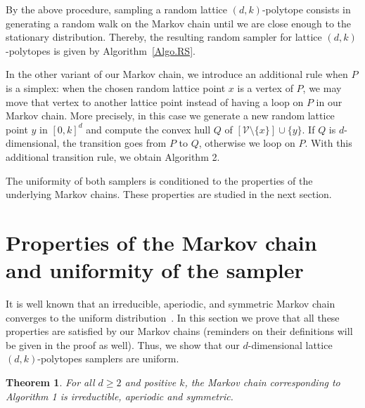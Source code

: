 \documentclass[a4paper]{article}
\newtheorem{theorem}{Theorem}
\begin{document}
By the above procedure, sampling a random lattice $(d,k)$-polytope consists in generating a random walk on the Markov chain until we are close enough to the stationary distribution. Thereby, the resulting random sampler for lattice $(d,k)$-polytopes is given by Algorithm~\ref{Algo.RS}.



In the other variant of our Markov chain, we introduce an additional rule when $P$ is a simplex: when the chosen random lattice point $x$ is a vertex of $P$, we may move that vertex to another lattice point instead of having a loop on $P$ in our Markov chain. More precisely, in this case we generate a new random lattice point $y$ in $[0,k]^d$ and compute the convex hull $Q$ of $[\mathcal{V}\mathord{\setminus}\{x\}]\cup\{y\}$. If $Q$ is $d$-dimensional, the transition goes from $P$ to $Q$, otherwise we loop on $P$. With this additional transition rule, we obtain Algorithm 2.\\



\vskip 12pt

The uniformity of both samplers is conditioned to the properties of the underlying Markov chains. These properties are studied in the next section.

\section{Properties of the Markov chain and uniformity of the sampler}\label{Sec.Pr}

It is well known that an irreducible, aperiodic, and symmetric Markov chain converges to the uniform distribution~\cite{levin2009markov}. In this section we prove that all these properties are satisfied by our Markov chains (reminders on their definitions will be given in the proof as well). Thus, we show that our $d$-dimensional lattice $(d,k)$-polytopes samplers are uniform.

\begin{theorem}\label{Thm.MC}
  For all $d\geq2$ and positive $k$, the Markov chain corresponding to Algorithm 1 is irreductible, aperiodic and symmetric.
\end{theorem}
\end{document}
